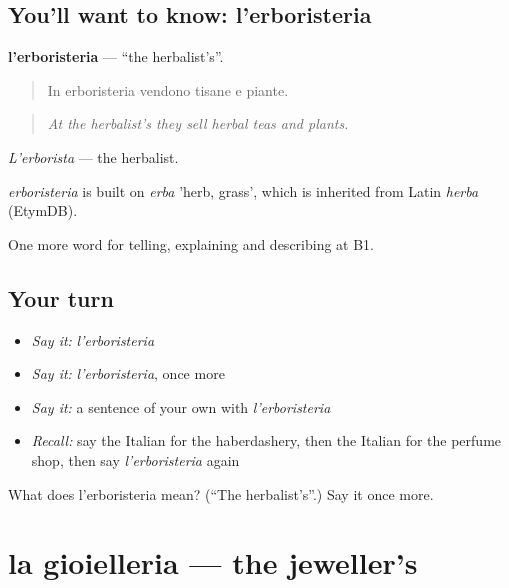\subsection*{You'll want to know: l'erboristeria}
\textbf{l'erboristeria} — \textquotedblleft{}the herbalist's\textquotedblright{}.

\begin{quote}
In erboristeria vendono tisane e piante.
\end{quote}

\begin{quote}
\emph{At the herbalist's they sell herbal teas and plants.}
\end{quote}

\emph{L'erborista} — the herbalist.

\begin{cousinweb}
\emph{erboristeria} is built on \emph{erba} 'herb, grass', which is inherited from Latin \emph{herba} (EtymDB).
\end{cousinweb}

\begin{grammarlens}[title={What you've built}]
One more word for telling, explaining and describing at B1.
\end{grammarlens}

\subsection*{Your turn}
\begin{itemize}
\raggedright
  \item \emph{Say it:} \emph{l'erboristeria}
  \item \emph{Say it:} \emph{l'erboristeria}, once more
  \item \emph{Say it:} a sentence of your own with \emph{l'erboristeria}
  \item \emph{Recall:} say the Italian for the haberdashery, then the Italian for the perfume shop, then say \emph{l'erboristeria} again
\end{itemize}

\begin{tcolorbox}[breakable,colback=teal!4,colframe=teal!35!black,title={Before you move on}]
What does l'erboristeria mean? (\textquotedblleft{}The herbalist's\textquotedblright{}.) Say it once more.
\end{tcolorbox}
\section[la gioielleria]{la gioielleria — the jeweller's}

